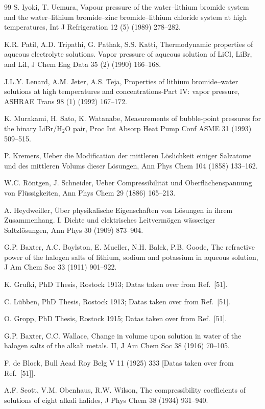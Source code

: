 \documentclass[11pt]{article}
\begin{document}
\begin{thebibliography}{99}
 S. Iyoki, T. Uemura, Vapour pressure of the
water--lithium bromide system and the water--lithium bromide--zinc
bromide--lithium chloride system at high temperatures, Int J
Refrigeration 12 (5) (1989) 278--282.

 K.R. Patil, A.D. Tripathi, G. Pathak, S.S. Katti,
Thermodynamic properties of aqueous electrolyte solutions. Vapor
pressure of aqueous solution of LiCl, LiBr, and LiI, J Chem Eng Data
35 (2) (1990) 166--168.

 J.L.Y. Lenard, A.M. Jeter, A.S. Teja, Properties of
lithium bromide--water solutions at high temperatures and
concentrations-Part IV: vapor pressure, ASHRAE Trans 98 (1) (1992)
167--172.

 K. Murakami, H. Sato, K. Watanabe, Measurements of
bubble-point pressures for the binary LiBr/H$_2$O pair, Proc Int
Absorp Heat Pump Conf ASME 31 (1993) 509--515.

 P. Kremers, Ueber die Modification der mittleren
L\"oslichkeit einiger Salzatome und des mittleren Volums dieser
L\"osungen, Ann Phys Chem 104 (1858) 133--162.

 W.C. R\"ontgen, J. Schneider, Ueber Compressibilit\"at
und Oberfl\"achenspannung von Fl\"ussigkeiten, Ann Phys Chem 29 (1886)
165--213.

 A. Heydweiller, \"Uber physikalische Eigenschaften von
L\"osungen in ihrem Zusammenhang. I. Dichte und elektrisches
Leitverm\"ogen w\"asseriger Saltzl\"osungen, Ann Phys 30 (1909)
873--904.

 G.P. Baxter, A.C. Boylston, E. Mueller, N.H. Balck,
P.B. Goode, The refractive power of the halogen salts of lithium,
sodium and potassium in aqueous solution, J Am Chem Soc 33 (1911)
901--922.

 K. Grufki, PhD Thesis, Rostock 1913; Datas taken over
from Ref.\ [51].

 C. L\"ubben, PhD Thesis, Rostock 1913; Datas taken over
from Ref.\ [51].

 O. Gropp, PhD Thesis, Rostock 1915; Datas taken over from
Ref.\ [51].

 G.P. Baxter, C.C. Wallace, Change in volume upon solution
in water of the halogen salts of the alkali metals. II, J Am Chem Soc
38 (1916) 70--105.

 F. de Block, Bull Acad Roy Belg V 11 (1925) 333 [Datas
taken over from Ref.\ [51]].

 A.F. Scott, V.M. Obenhaus, R.W. Wilson, The
compressibility coefficients of solutions of eight alkali halides,
J Phys Chem 38 (1934) 931--940.


\end{thebibliography}
\end{document}
